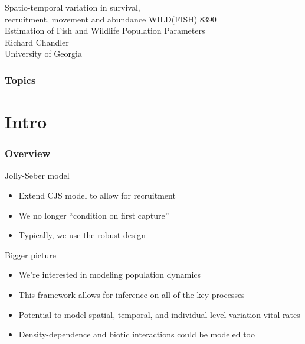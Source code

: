 \documentclass[color=usenames,dvipsnames]{beamer}\usepackage[]{graphicx}\usepackage[]{color}
\begin{document}
\begin{frame}[plain]
  \centering
  \LARGE
  Spatio-temporal variation in %
  survival, \\ recruitment, movement and abundance %
  \vfill
  \large
  WILD(FISH) 8390 \\
  Estimation of Fish and Wildlife Population Parameters \\
  \vfill
  Richard Chandler \\
  University of Georgia \\
\end{frame}







\begin{frame}[plain]
  \frametitle{Topics}
  \Large
\end{frame}




\section{Intro}






\begin{frame}
  \frametitle{Overview}
  {Jolly-Seber model}
  \begin{itemize}
    \normalsize
    \item Extend CJS model to allow for recruitment
    \item We no longer ``condition on first capture''
    \item Typically, we use the robust design
  \end{itemize}
  \pause \vfill
  Bigger picture
  \begin{itemize}
    \normalsize
    \item<2-> We're interested in modeling population dynamics
    \item<3-> This framework allows for inference on \alert{all} of the
      key processes 
    \item<4-> Potential to model spatial, temporal, and individual-level
      variation vital rates
    \item<5-> Density-dependence and biotic interactions could be
      modeled too
  \end{itemize}
\end{frame}
\end{document}

